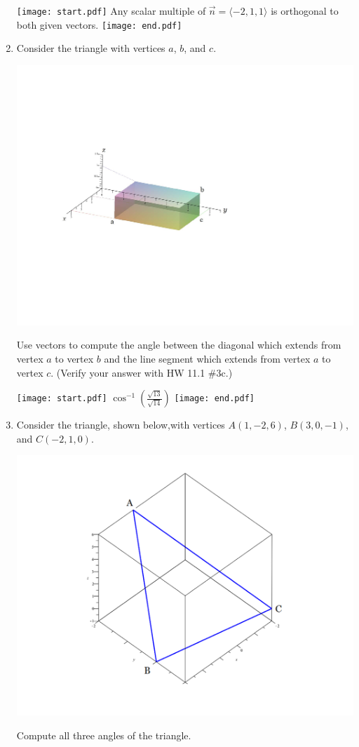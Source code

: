\documentclass[12pt]{article}
\begin{document}
\begin{enumerate}
\texttt{[image: start.pdf]}
{{Any scalar multiple of $\overrightarrow{n}=\langle -2,1,1 \rangle$ is orthogonal to both given vectors.}}
\texttt{[image: end.pdf]}


\newpage

\item Consider the triangle with vertices $a$, $b$, and $c$.
\begin{center}
\includegraphics[scale=0.6]{box.pdf}
\end{center}
Use vectors to compute the angle between the diagonal which extends from vertex $a$ to vertex $b$ and the line segment which extends from vertex $a$ to vertex $c$. (Verify your answer with HW 11.1 \#3c.)

\texttt{[image: start.pdf]}
{{$\cos^{-1}\left(\frac{\sqrt{13}}{\sqrt{14}}\right)$}}
\texttt{[image: end.pdf]}


\item Consider the triangle, shown below,with vertices $A(1,-2,6)$, $B(3,0,-1)$, and $C(-2,1,0)$.
\begin{center}
\includegraphics[scale=0.5]{triangle.pdf}
\end{center}
Compute all three angles of the triangle.


\end{enumerate}
\end{document}
